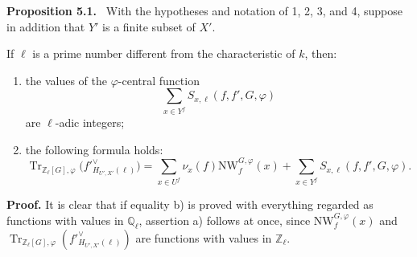 \documentclass[11pt]{article}
\newenvironment{statement}[1]{\par\medskip\noindent\textbf{#1.}\ }{\par\medskip}
\providecommand{\Tr}{\operatorname{Tr}}
\providecommand{\Tr}{\operatorname{Tr}}
\providecommand{\Tr}{\operatorname{Tr}}
\providecommand{\Tr}{\operatorname{Tr}}
\providecommand{\bZ}{\mathbb Z}
\providecommand{\bQ}{\mathbb Q}
\providecommand{\Tr}{\operatorname{Tr}}
\begin{document}
\label{sga5:XII:proposition:5.1}\begin{statement}{Proposition 5.1}
With the hypotheses and notation of 1, 2, 3, and 4, suppose in addition that $Y'$ is a finite subset of $X'$.

If $\ell$ is a prime number different from the characteristic of $k$, then:
\begin{enumerate}[label=\alph*)]
\item the values of the $\varphi$-central function
\[
\sum_{x\in Y^f}S_{x,\ell}(f,f',G,\varphi)
\]
are $\ell$-adic integers;
\item the following formula holds:
\begin{equation}\tag{5.1.1}\label{sga5:XII:equation:5.1.1}
\Tr_{\bZ_\ell[G],\varphi}\bigl(f'^\vee_{H_{U',X'}(\ell)}\bigr)
=\sum_{x\in U^f}\nu_x(f)\mathrm{NW}^{G,\varphi}_f(x)
+\sum_{x\in Y^f}S_{x,\ell}(f,f',G,\varphi).
\end{equation}
\end{enumerate}
\end{statement}

\noindent
\textbf{Proof.} It is clear that if equality b) is proved with everything regarded as functions with values in $\bQ_\ell$, assertion a) follows at once, since $\mathrm{NW}^{G,\varphi}_{f}(x)$ and $\Tr_{\bZ_\ell[G],\varphi}(f'^\vee_{H_{U',X'}(\ell)})$ are functions with values in $\bZ_\ell$.
\end{document}
